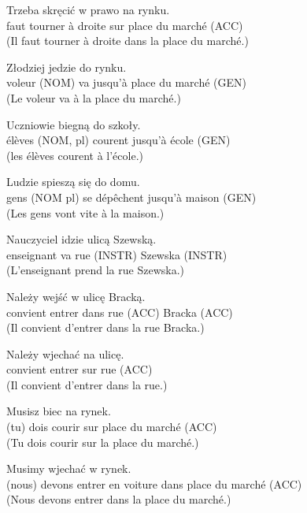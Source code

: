 \documentclass[output=paper]{langscibook}
\begin{document}
\begin{otherlanguage}{french}
\begin{paperappendix}
\begin{exe}
\gll Trzeba   skręcić   w prawo   na   rynku.\\
      faut     tourner   à droite     sur   {place du marché (ACC)}\\
\glt (Il faut tourner à droite dans la place du marché.)
\end{exe}


\begin{exe}
\gll  Złodziej     jedzie     do     rynku.\\
     {voleur (NOM)}   va     jusqu’à     {place du marché (GEN)}\\
\glt (Le voleur va à la place du marché.)

\gll Uczniowie     biegną     do     szkoły.\\
      {élèves (NOM, pl)} courent   jusqu’à     {école (GEN)}\\
\glt (les élèves courent à l’école.)

\gll Ludzie     {spieszą się}     do     domu.\\
      {gens (NOM pl)} {se dépêchent}    jusqu’à    {maison (GEN)}\\
\glt (Les gens vont vite à la maison.)

\gll Nauczyciel   idzie   ulicą     Szewską.\\
      enseignant   va   {rue (INSTR)} {Szewska (INSTR)}\\
\glt (L’enseignant prend la rue Szewska.)

\gll Należy   wejść     w     ulicę     Bracką.\\
      convient   entrer     dans     {rue (ACC)}   {Bracka (ACC)}\\
\glt (Il convient d’entrer dans la rue Bracka.)

\gll Należy   wjechać   na   ulicę.\\
      convient   entrer    sur   {rue (ACC)}\\
\glt (Il convient d’entrer dans la rue.)

\gll Musisz     biec     na     rynek.\\
      {(tu)  dois} courir     sur     {place du marché (ACC)}\\
\glt (Tu dois courir sur la place du marché.)

\gll Musimy     wjechać     w   rynek.\\
      {(nous) devons} {entrer en voiture}   dans   {place du marché (ACC)}\\
\glt (Nous devons entrer dans la place du marché.)


\end{exe}
\end{paperappendix}
\end{otherlanguage}
\end{document}
